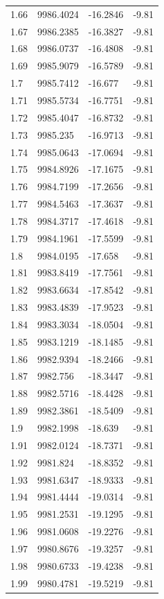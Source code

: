\begin{table}[H]
\begin{tabular}{llll}
1.66 & 9986.4024 & -16.2846 & -9.81 \\
1.67 & 9986.2385 & -16.3827 & -9.81 \\
1.68 & 9986.0737 & -16.4808 & -9.81 \\
1.69 & 9985.9079 & -16.5789 & -9.81 \\
1.7 & 9985.7412 & -16.677 & -9.81 \\
1.71 & 9985.5734 & -16.7751 & -9.81 \\
1.72 & 9985.4047 & -16.8732 & -9.81 \\
1.73 & 9985.235 & -16.9713 & -9.81 \\
1.74 & 9985.0643 & -17.0694 & -9.81 \\
1.75 & 9984.8926 & -17.1675 & -9.81 \\
1.76 & 9984.7199 & -17.2656 & -9.81 \\
1.77 & 9984.5463 & -17.3637 & -9.81 \\
1.78 & 9984.3717 & -17.4618 & -9.81 \\
1.79 & 9984.1961 & -17.5599 & -9.81 \\
1.8 & 9984.0195 & -17.658 & -9.81 \\
1.81 & 9983.8419 & -17.7561 & -9.81 \\
1.82 & 9983.6634 & -17.8542 & -9.81 \\
1.83 & 9983.4839 & -17.9523 & -9.81 \\
1.84 & 9983.3034 & -18.0504 & -9.81 \\
1.85 & 9983.1219 & -18.1485 & -9.81 \\
1.86 & 9982.9394 & -18.2466 & -9.81 \\
1.87 & 9982.756 & -18.3447 & -9.81 \\
1.88 & 9982.5716 & -18.4428 & -9.81 \\
1.89 & 9982.3861 & -18.5409 & -9.81 \\
1.9 & 9982.1998 & -18.639 & -9.81 \\
1.91 & 9982.0124 & -18.7371 & -9.81 \\
1.92 & 9981.824 & -18.8352 & -9.81 \\
1.93 & 9981.6347 & -18.9333 & -9.81 \\
1.94 & 9981.4444 & -19.0314 & -9.81 \\
1.95 & 9981.2531 & -19.1295 & -9.81 \\
1.96 & 9981.0608 & -19.2276 & -9.81 \\
1.97 & 9980.8676 & -19.3257 & -9.81 \\
1.98 & 9980.6733 & -19.4238 & -9.81 \\
1.99 & 9980.4781 & -19.5219 & -9.81 \\

\end{tabular}
\end{table}
